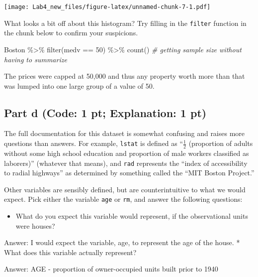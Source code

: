 \documentclass[
]{article}
\newenvironment{Shaded}{\begin{snugshade}}{\end{snugshade}}
\newcommand{\CommentTok}[1]{\textcolor[rgb]{0.56,0.35,0.01}{\textit{#1}}}
\newcommand{\DecValTok}[1]{\textcolor[rgb]{0.00,0.00,0.81}{#1}}
\newcommand{\FunctionTok}[1]{\textcolor[rgb]{0.00,0.00,0.00}{#1}}
\newcommand{\NormalTok}[1]{#1}
\newcommand{\SpecialCharTok}[1]{\textcolor[rgb]{0.00,0.00,0.00}{#1}}
\providecommand{\tightlist}{%
  \setlength{\itemsep}{0pt}\setlength{\parskip}{0pt}}
\begin{document}
\texttt{[image: Lab4\_new\_files/figure-latex/unnamed-chunk-7-1.pdf]}

What looks a bit off about this histogram? Try filling in the
\texttt{filter} function in the chunk below to confirm your suspicions.

\begin{Shaded}
\begin{Highlighting}[]
\NormalTok{Boston }\SpecialCharTok{\%\textgreater{}\%} 
  \FunctionTok{filter}\NormalTok{(medv }\SpecialCharTok{==} \DecValTok{50}\NormalTok{) }\SpecialCharTok{\%\textgreater{}\%}
  \FunctionTok{count}\NormalTok{() }\CommentTok{\# getting sample size without having to summarize}
\end{Highlighting}
\end{Shaded}

The prices were capped at 50,000 and thus any property worth more than
that was lumped into one large group of a value of 50.

\hypertarget{part-d-code-1-pt-explanation-1-pt}{%
\subsection{Part d (Code: 1 pt; Explanation: 1
pt)}\label{part-d-code-1-pt-explanation-1-pt}}

The full documentation for this dataset is somewhat confusing and raises
more questions than answers. For example, \texttt{lstat} is defined as
``\(\frac{1}{2}\) (proportion of adults without some high school
education and proportion of male workers classified as laborers)''
(whatever that means), and \texttt{rad} represents the ``index of
accessibility to radial highways'' as determined by something called the
``MIT Boston Project.''

Other variables are sensibly defined, but are counterintuitive to what
we would expect. Pick either the variable \texttt{age} or \texttt{rm},
and answer the following questions:

\begin{itemize}
\tightlist
\item
  What do you expect this variable would represent, if the observational
  units were houses?
\end{itemize}

Answer: I would expect the variable, age, to represent the age of the
house. * What does this variable actually represent?

Answer: AGE - proportion of owner-occupied units built prior to 1940
\end{document}
